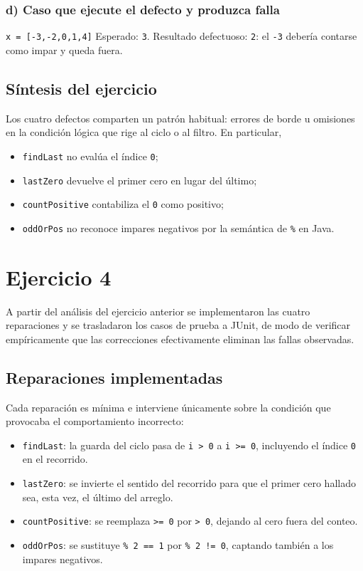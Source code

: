 \documentclass[12pt,a4paper]{article}
\begin{document}
\subsubsection*{d) Caso que ejecute el defecto y produzca falla}
\texttt{x = [-3,-2,0,1,4]} \hspace{0.5cm} Esperado: \texttt{3}. Resultado defectuoso: \texttt{2}: el \texttt{-3} debería contarse como impar y queda fuera.

\subsection{Síntesis del ejercicio}
Los cuatro defectos comparten un patrón habitual: errores de borde u omisiones en la condición lógica que rige al ciclo o al filtro. En particular,
\begin{itemize}
  \item \texttt{findLast} no evalúa el índice \texttt{0};
  \item \texttt{lastZero} devuelve el primer cero en lugar del último;
  \item \texttt{countPositive} contabiliza el \texttt{0} como positivo;
  \item \texttt{oddOrPos} no reconoce impares negativos por la semántica de \texttt{\%} en Java.
\end{itemize}

\section{Ejercicio 4}
A partir del análisis del ejercicio anterior se implementaron las cuatro reparaciones y se trasladaron los casos de prueba a JUnit, de modo de verificar empíricamente que las correcciones efectivamente eliminan las fallas observadas.

\subsection{Reparaciones implementadas}
Cada reparación es mínima e interviene únicamente sobre la condición que provocaba el comportamiento incorrecto:
\begin{itemize}
  \item \texttt{findLast}: la guarda del ciclo pasa de \texttt{i > 0} a \texttt{i >= 0}, incluyendo el índice \texttt{0} en el recorrido.
  \item \texttt{lastZero}: se invierte el sentido del recorrido para que el primer cero hallado sea, esta vez, el último del arreglo.
  \item \texttt{countPositive}: se reemplaza \texttt{>= 0} por \texttt{> 0}, dejando al cero fuera del conteo.
  \item \texttt{oddOrPos}: se sustituye \texttt{\% 2 == 1} por \texttt{\% 2 != 0}, captando también a los impares negativos.
\end{itemize}
\end{document}
